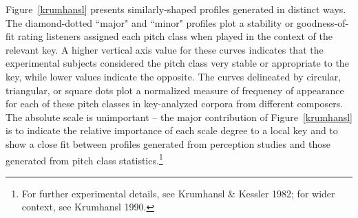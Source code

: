 Figure~\ref{krumhansl} presents similarly-shaped profiles generated in distinct ways.  The diamond-dotted ``major" and ``minor" profiles plot a stability or goodness-of-fit rating listeners assigned each pitch class when played in the context of the relevant key.  A higher vertical axis value for these curves indicates that the experimental subjects considered the pitch class very stable or appropriate to the key, while lower values indicate the opposite.  The curves delineated by circular, triangular, or square dots plot a normalized measure of frequency of appearance for each of these pitch classes in key-analyzed corpora from different composers.  The absolute scale is unimportant -- the major contribution of Figure~\ref{krumhansl} is to indicate the relative importance of each scale degree to a local key and to show a close fit between profiles generated from perception studies and those generated from pitch class statistics.\footnote{For further experimental details, see Krumhansl \& Kessler 1982; for wider context, see Krumhansl 1990.}

